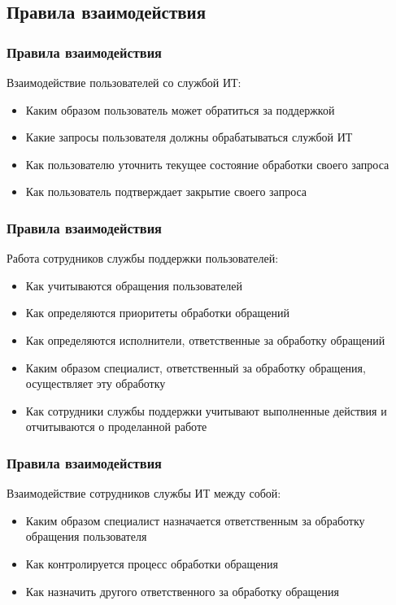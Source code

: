\documentclass{../industrial-development}
\begin{document}
\subsection{Правила взаимодействия}
\begin{frame} \frametitle{Правила взаимодействия}
	Взаимодействие пользователей со службой ИТ:
	\begin{itemize} 
		\item Каким образом пользователь может обратиться за поддержкой 
		\item Какие запросы пользователя должны обрабатываться службой ИТ
		\item Как пользователю уточнить текущее состояние обработки своего запроса
		\item Как пользователь подтверждает закрытие своего запроса
	\end{itemize}
\end{frame}

\lecturenotes

\begin{frame} \frametitle{Правила взаимодействия}
	Работа сотрудников службы поддержки пользователей:
	\begin{itemize} 
		\item Как учитываются обращения пользователей 
		\item Как определяются приоритеты обработки обращений 
		\item Как определяются исполнители, ответственные за обработку обращений 
		\item Каким образом специалист, ответственный за обработку обращения, осуществляет эту обработку 
		\item Как сотрудники службы поддержки учитывают выполненные действия и отчитываются о проделанной работе 
	\end{itemize}
\end{frame}

\lecturenotes

\begin{frame} \frametitle{Правила взаимодействия}
Взаимодействие сотрудников службы ИТ между собой: 
	\begin{itemize} 
		\item Каким образом специалист назначается ответственным за обработку обращения пользователя 
		\item Как контролируется процесс обработки обращения 
		\item Как назначить другого ответственного за обработку обращения 
	\end{itemize}
\end{frame}

\lecturenotes
\end{document}
